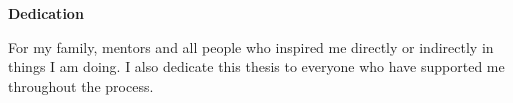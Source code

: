 
\newpage
\vspace*{0.9cm}
\begin{center}
{\bf \Huge Dedication}
\end{center}

\setlength{\baselineskip}{0.8cm}


For my family, mentors and all people who inspired me directly or indirectly in things I am doing. I also dedicate this thesis to everyone who have supported me throughout the process.
